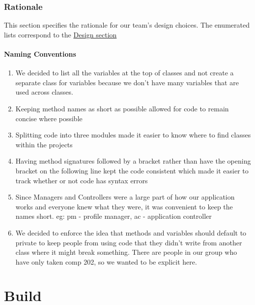 \documentclass[12pt]{report}
\begin{document}
\section{Rationale}
\label{s:integration-rationale}
This section specifies the rationale for our team's design choices. The enumerated lists correspond to the \hyperref[s:integration-design]{Design section}

\subsection{Naming Conventions}
\begin{enumerate}
    \item We decided to list all the variables at the top of classes and not create a separate class for variables because we don't have many variables that are used across classes.
    \item Keeping method names as short as possible allowed for code to remain concise where possible
    \item Splitting code into three modules made it easier to know where to find classes within the projects
    \item Having method signatures followed by a bracket rather than have the opening bracket on the following line kept the code consistent which made it easier to track whether or not code has syntax errors
    \item Since Managers and Controllers were a large part of how our application works and everyone knew what they were, it was convenient to keep the names short. eg: pm - profile manager, ac - application controller
    \item We decided to enforce the idea that methods and variables should default to private to keep people from using code that they didn't write from another class where it might break something. There are people in our group who have only taken comp 202, so we wanted to be explicit here. 
\end{enumerate}

\part{Build}
\end{document}
